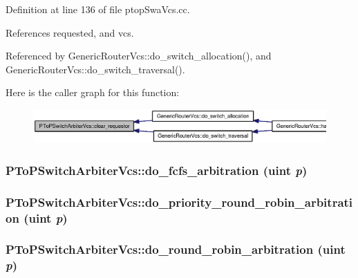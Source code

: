Definition at line 136 of file ptopSwaVcs.cc.

References requested, and vcs.

Referenced by GenericRouterVcs::do\_\-switch\_\-allocation(), and GenericRouterVcs::do\_\-switch\_\-traversal().

Here is the caller graph for this function:\nopagebreak
\begin{figure}[H]
\begin{center}
\leavevmode
\includegraphics[width=420pt]{classPToPSwitchArbiterVcs_78a137f4c943b0e2fe41ec07cf744d8c_icgraph}
\end{center}
\end{figure}
\subsubsection[{do\_\-fcfs\_\-arbitration}]{ PToPSwitchArbiterVcs::do\_\-fcfs\_\-arbitration ({\bf uint} {\em p})}\label{classPToPSwitchArbiterVcs_1c0ac30090af685d204d4b2ea12ec522}


\subsubsection[{do\_\-priority\_\-round\_\-robin\_\-arbitration}]{ PToPSwitchArbiterVcs::do\_\-priority\_\-round\_\-robin\_\-arbitration ({\bf uint} {\em p})}\label{classPToPSwitchArbiterVcs_f93133346164b48460122959cb08b763}


\subsubsection[{do\_\-round\_\-robin\_\-arbitration}]{ PToPSwitchArbiterVcs::do\_\-round\_\-robin\_\-arbitration ({\bf uint} {\em p})}\label{classPToPSwitchArbiterVcs_e8adb19a43c5674bae5f4cab64b58a14}




